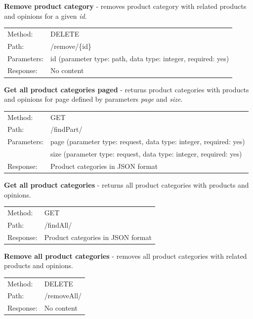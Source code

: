 \documentclass[12pt,a4paper]{article}
\begin{document}
\noindent\textbf{Remove product category} - removes product category with related products and opinions for a given \textit{id}.

{\renewcommand{\arraystretch}{1}
  \begin{tabular}{ll}
  Method: & DELETE \\
  Path: & /remove/\{id\} \\
  Parameters: & id (parameter type: path, data type: integer, required: yes)\\
  Response: & No content  \\
  \end{tabular} \vspace{5mm}
}

\noindent\textbf{Get all product categories paged} - returns product categories with products and opinions for page defined by parameters \textit{page} and \textit{size}.

{\renewcommand{\arraystretch}{1}
  \begin{tabular}{ll}
  Method: & GET \\
  Path: & /findPart/ \\
  Parameters: & page (parameter type: request, data type: integer, required: yes)\\
              & size (parameter type: request, data type: integer, required: yes)\\
  Response: & Product categories in JSON format  \\
  \end{tabular} \vspace{5mm}
  }
  
\noindent\textbf{Get all product categories} - returns all product categories with products and opinions.

{\renewcommand{\arraystretch}{1}
  \begin{tabular}{ll}
  Method: & GET \\
  Path: & /findAll/ \\
  Response: & Product categories in JSON format  \\
  \end{tabular} \vspace{5mm}
}

\noindent\textbf{Remove all product categories} - removes all product categories with related products and opinions.

{\renewcommand{\arraystretch}{1}
  \begin{tabular}{ll}
  Method: & DELETE \\
  Path: & /removeAll/ \\
  Response: & No content  \\
  \end{tabular} \vspace{5mm}
}
  
\end{document}
